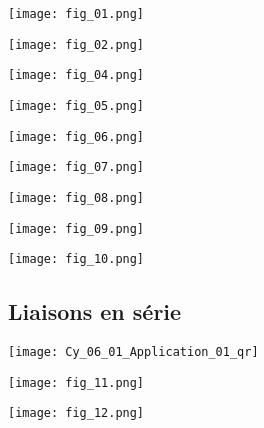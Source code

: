 \begin{multicols}{2}
\begin{center}
\texttt{[image: fig\_01.png]}
\end{center}

\begin{center}
\texttt{[image: fig\_02.png]}
\end{center}

\begin{center}
\end{center}

\begin{center}
\texttt{[image: fig\_04.png]}
\end{center}

\begin{center}
\texttt{[image: fig\_05.png]}
\end{center}

\begin{center}
\texttt{[image: fig\_06.png]}
\end{center}


\begin{center}
\texttt{[image: fig\_07.png]}
\end{center}

\begin{center}
\texttt{[image: fig\_08.png]}
\end{center}



\begin{center}
\texttt{[image: fig\_09.png]}
\end{center}

\begin{center}
\texttt{[image: fig\_10.png]}
\end{center}

\end{multicols}
\subsection*{Liaisons en série}


\ifprof
\else
\begin{marginfigure}
\centering
\texttt{[image: Cy\_06\_01\_Application\_01\_qr]}
\end{marginfigure}
\fi


\begin{multicols}{2}
\begin{center}
\texttt{[image: fig\_11.png]}
\end{center}
\begin{center}
\texttt{[image: fig\_12.png]}
\end{center}
\end{multicols}
